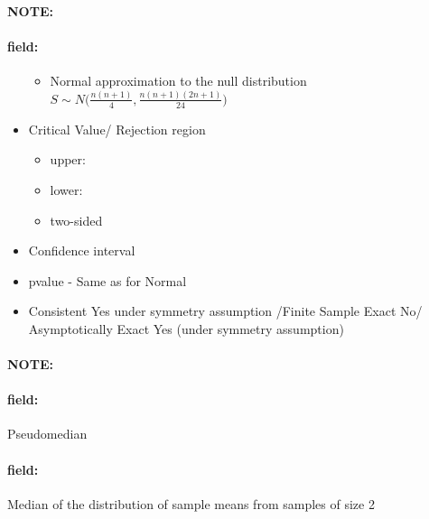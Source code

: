 \documentclass[12pt]{article}
\newenvironment{note}{\paragraph{NOTE:}}{}
\newenvironment{field}{\paragraph{field:}}{}
\begin{document}
\begin{note}
\begin{field}
\begin{itemize}
\begin{itemize}
          \item Normal approximation to the null distribution $S \sim N\big(\frac{n(n+1)}{4}, \frac{n(n+1)(2n+1)}{24}\big)$
         \end{itemize}
   \item Critical Value/ Rejection region
         \begin{itemize}
          \item upper:
          \item lower:
          \item two-sided
         \end{itemize}
   \item Confidence interval
   \item pvalue - Same as for Normal
   \item Consistent Yes under symmetry assumption /Finite Sample Exact No/ Asymptotically Exact Yes (under symmetry assumption)
  \end{itemize}
 \end{field}
\end{note}

\begin{note}
 \begin{field}
  Pseudomedian
 \end{field}
 \begin{field}
  Median of the distribution of sample means from samples of size 2
 \end{field}
\end{note}
\end{document}
